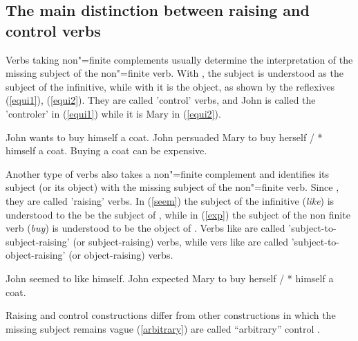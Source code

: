 \documentclass[output=paper
                ,modfonts
                ,nonflat
	        ,collection
	        ,collectionchapter
	        ,collectiontoclongg
 	        ,biblatex
                ,babelshorthands
                ,newtxmath
                ,draftmode
                ,colorlinks, citecolor=brown
]{./langsci/langscibook}
\begin{document}
\subsection{The main distinction between raising and control verbs}

Verbs taking non"=finite complements usually determine the interpretation of the missing subject of the non"=finite verb. With , the subject is understood as the subject of the infinitive, while with  it is the object, as shown by the reflexives (\ref{equi1}), (\ref{equi2}). They are called 'control' verbs, and John is called the 'controler' in (\ref{equi1}) while it is Mary in (\ref{equi2}).

	\begin{exe}
	\ex \begin{xlist}
	\ex John wants to buy himself a coat. \label{equi1}
   \ex 	John persuaded Mary to buy herself / * himself a coat.\label{equi2}
 \ex Buying a coat can be expensive.\label{arbitrary}
 \end{xlist}
 \end{exe}


Another type of verbs also takes a non"=finite complement and identifies its subject (or its object) with the missing subject of the non"=finite verb. Since \citet{Postal1974}, they are called 'raising' verbs. In (\ref{seem}) the subject of the infinitive (\emph{like}) is understood to the be the subject of , while in (\ref{exp}) the subject of the non finite verb (\emph{buy}) is understood to be the object of . Verbs like  are called 'subject-to-subject-raising' (or subject-raising) verbs, while
vers like  are called 'subject-to-object-raising' (or object-raising) verbs.

\begin{exe}
	\ex \begin{xlist}
	\ex John seemed to like himself.\label{seem}
\ex  John expected Mary to buy herself / * himself a coat. \label{exp}
\end{xlist}
 \end{exe}
 
 Raising and control constructions differ from other constructions in which the missing subject remains vague (\ref{arbitrary}) are called ``arbitrary'' control \citep{Bresnan1982}.\\
\end{document}
